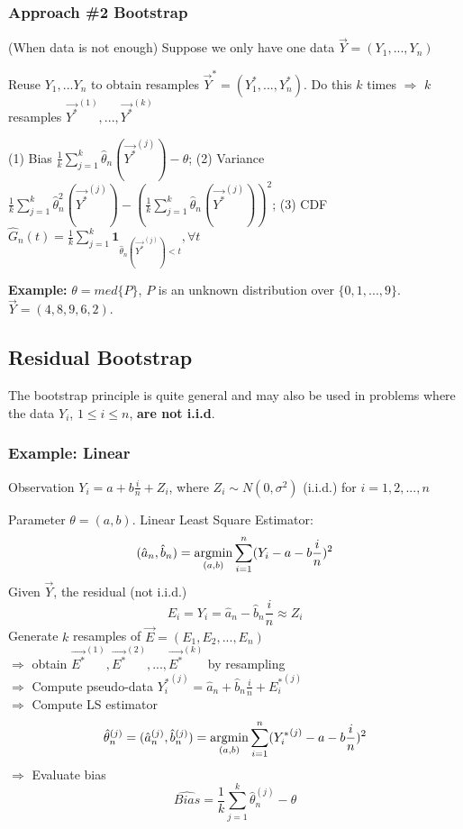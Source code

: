 \documentclass[11pt,a4paper]{article}
\newcommand{\argmin}{\operatornamewithlimits{argmin}}
\begin{document}
\subsubsection*{Approach \#2 Bootstrap}(When data is not enough)
Suppose we only have one data $\vec{Y}=(Y_1,...,Y_n)$

Reuse $Y_1,...Y_n$ to obtain resamples $\vec{Y}^*=(Y_1^*,...,Y_n^*)$. Do this $k$ times $\Rightarrow$ $k$ resamples ${\vec{Y^*}}^{(1)},...,{\vec{Y^*}}^{(k)}$

(1) Bias $\frac{1}{k}\sum_{j=1}^k \hat{\theta}_n(\vec{Y^*}^{(j)})-\theta$; (2) Variance $\frac{1}{k}\sum_{j=1}^k \hat{\theta}^2_n(\vec{Y^*}^{(j)})-\left(\frac{1}{k}\sum_{j=1}^k \hat{\theta}_n(\vec{Y^*}^{(j)})\right)^2$; (3) CDF $\hat{G}_{n}(t)=\frac{1}{k}\sum_{j=1}^k \mathbf{1}_{\hat{\theta}_n(\vec{Y^*}^{(j)})<t},\forall t$

\textbf{Example:} $\theta=med\{P\}$, $P$ is an unknown distribution over $\{0,1,...,9\}$. $\vec{Y}=(4,8,9,6,2)$.



\subsection{Residual Bootstrap}
The bootstrap principle is quite general and may also be used in problems where the data $Y_i$, $1\leq i\leq n$, \textbf{are not i.i.d}.

\subsubsection*{Example: Linear}
Observation $Y_i=a+b\frac{i}{n}+Z_i$, where $Z_i\sim N(0,\sigma^2)$ (i.i.d.) for $i=1,2,...,n$

Parameter $\theta=(a,b)$. Linear Least Square Estimator:
$$(\hat{a}_n,\hat{b}_n)=\argmin_{(a,b)}\sum_{i=1}^n(Y_i-a-b\frac{i}{n})^2$$
Given $\vec{Y}$, the residual (not i.i.d.)$$E_i=Y_i=\hat{a}_n-\hat{b}_n\frac{i}{n}\approx Z_i$$
Generate $k$ resamples of $\vec{E}=(E_1,E_2,...,E_n)$\\
$\Rightarrow$ obtain $\vec{E^*}^{(1)},\vec{E^*}^{(2)},...,\vec{E^*}^{(k)}$ by resampling\\
$\Rightarrow$ Compute pseudo-data ${Y_i^*}^{(j)}=\hat{a}_n+\hat{b}_n\frac{i}{n}+{E_i^*}^{(j)}$\\
$\Rightarrow$ Compute LS estimator $$\hat{\theta}_n^{(j)}=(\hat{a}_n^{(j)},\hat{b}_n^{(j)})=\argmin_{(a,b)}\sum_{i=1}^n({Y_i^*}^{(j)}-a-b\frac{i}{n})^2$$
$\Rightarrow$ Evaluate bias $$\widehat{Bias}=\frac{1}{k}\sum_{j=1}^k \hat{\theta}_n^{(j)}-\theta$$
\end{document}
